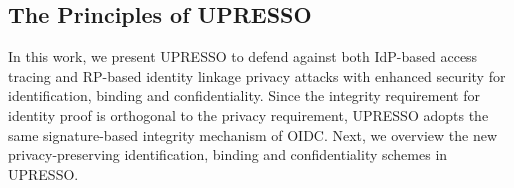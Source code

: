 \begin{comment}
\end{itemize}
Additionally, it introduces another challenge to provide distinct user identifier while hiding RP's identity
\begin{itemize}
\item \textbf{RP is unable to identify the user: }To hide RP's identity, the single RP's multiple authentication requests should be considered from different RPs by IdP. However, the user identifier provided by IdP is solely bound with an RP to avoid linking the user through RPs' collusion. It means that the single user's multiple identifiers for one RP will never be constant. Therefore, RP is unable to identify the user no longer.
\end{itemize}
\end{comment}


\subsection{The Principles of UPRESSO}
\label{subsec:solutions}
In this work, we present UPRESSO to defend against both IdP-based access tracing and RP-based identity linkage privacy attacks with enhanced security for identification, binding and confidentiality. %
Since the integrity requirement for identity proof is orthogonal to the privacy requirement, UPRESSO adopts the same signature-based integrity mechanism of OIDC.
Next, we overview the new privacy-preserving identification, binding and confidentiality schemes in UPRESSO.

